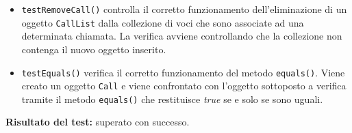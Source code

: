 \begin{itemize}
\begin{itemize}
\item \texttt{testRemoveCall()} controlla il corretto funzionamento dell'eliminazione di un oggetto \texttt{CallList} dalla collezione di voci che sono associate ad una determinata chiamata. La verifica avviene controllando che la collezione non contenga il nuovo oggetto inserito.

\item \texttt{testEquals()}
verifica il corretto funzionamento del metodo \texttt{equals()}. Viene creato un oggetto \texttt{Call} e viene confrontato con l'oggetto sottoposto a verifica tramite il metodo \texttt{equals()} che restituisce \textit{true} se e solo se sono uguali.
 
\end{itemize}
\textbf{Risultato del test:} superato con successo.


\end{itemize}

